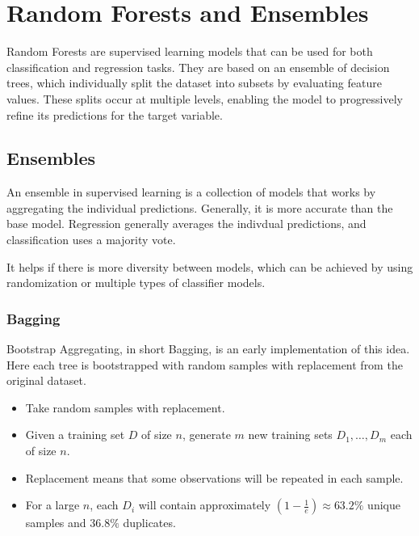 \section{Random Forests and Ensembles}

Random Forests are supervised learning models that can be used for
both classification and regression tasks. They are based on an
ensemble of decision trees, which individually split the dataset into
subsets by evaluating feature values. These splits occur at multiple
levels, enabling the model to progressively refine its predictions
for the target variable.

\subsection{Ensembles}

An ensemble in supervised learning is a collection of models that
works by aggregating the individual predictions. Generally, it is more
accurate than the base model. Regression generally averages the indivdual
predictions, and classification uses a majority vote.

It helps if there is more diversity between models, which can be achieved by
using randomization or multiple types of classifier models.

\subsubsection{Bagging}

Bootstrap Aggregating, in short Bagging, is an early implementation of this
idea. Here each tree is bootstrapped with random samples with replacement
from the original dataset.

\begin{definition}[Bagging]
  \begin{itemize}
    \item Take random samples with replacement.
    \item Given a training set $D$ of size $n$, generate $m$
      new training sets $D_1, \dots, D_m$ each of size $n$.
    \item Replacement means that some observations will be
      repeated in each sample.
    \item For a large $n$, each $D_i$ will contain approximately $(1 -
      \frac{1}{e}) \approx 63.2\%$ unique samples and $36.8\%$ duplicates.
  \end{itemize}
\end{definition}

